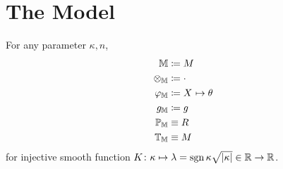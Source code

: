 \documentclass[../main.tex]{subfiles}
\begin{document}
\section{The Model}
\begin{ModelGroupElement}
For any parameter \(\kappa, n\),
\begin{align*}
\elements&\coloneqq M\\
\groupoperation{\elements}&\coloneqq\cdot\\
\charts{\elements}&\coloneqq\tensor{X}{}\mapsto\tensor{\theta}{}\\
\innerprod{\elements}&\coloneqq g\\
\points{\elements}&\equiv R\\
\transformations{\elements}&\equiv M\\
\end{align*}
for injective smooth function \(K\colon\kappa\mapsto\lambda=\operatorname{sgn}{\kappa}\sqrt{\lvert\kappa\rvert}\in\mathbb{R}\to\mathbb{R}\).
\end{ModelGroupElement}
\begin{ModelGroupAssertion}
\end{ModelGroupAssertion}
\begin{ModelCurvatureAssertion}
\end{ModelCurvatureAssertion}
\end{document}

